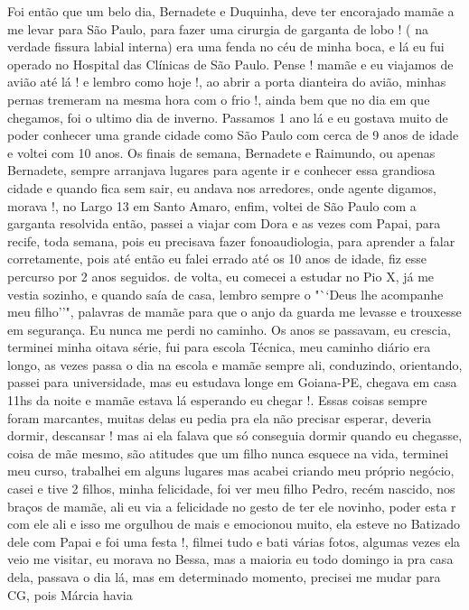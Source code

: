 \documentclass[
  brazil,
  a6paper,
  oneside,
  landscape,
  14pt]{scrbook}
\begin{document}
Foi então que um belo dia, Bernadete e Duquinha, deve ter encorajado
mamãe a me levar para São Paulo, para fazer uma cirurgia de garganta de
lobo ! ( na verdade fissura labial interna) era uma fenda no céu de
minha boca, e lá eu fui operado no Hospital das Clínicas de São Paulo.
Pense ! mamãe e eu viajamos de avião até lá ! e lembro como hoje !, ao
abrir a porta dianteira do avião, minhas pernas tremeram na mesma hora
com o frio !, ainda bem que no dia em que chegamos, foi o ultimo dia de
inverno. Passamos 1 ano lá e eu gostava muito de poder conhecer uma
grande cidade como São Paulo com cerca de 9 anos de idade e voltei com
10 anos. Os finais de semana, Bernadete e Raimundo, ou apenas Bernadete,
sempre arranjava lugares para agente ir e conhecer essa grandiosa cidade
e quando fica sem sair, eu andava nos arredores, onde agente digamos,
morava !, no Largo 13 em Santo Amaro, enfim, voltei de São Paulo com a
garganta resolvida então, passei a viajar com Dora e as vezes com Papai,
para recife, toda semana, pois eu precisava fazer fonoaudiologia, para
aprender a falar corretamente, pois até então eu falei errado até os 10
anos de idade, fiz esse percurso por 2 anos seguidos. de volta, eu
comecei a estudar no Pio X, já me vestia sozinho, e quando saía de casa,
lembro sempre o "``Deus lhe acompanhe meu filho''", palavras de mamãe
para que o anjo da guarda me levasse e trouxesse em segurança. Eu nunca
me perdi no caminho. Os anos se passavam, eu crescia, terminei minha
oitava série, fui para escola Técnica, meu caminho diário era longo, as
vezes passa o dia na escola e mamãe sempre ali, conduzindo, orientando,
passei para universidade, mas eu estudava longe em Goiana-PE, chegava em
casa 11hs da noite e mamãe estava lá esperando eu chegar !. Essas coisas
sempre foram marcantes, muitas delas eu pedia pra ela não precisar
esperar, deveria dormir, descansar ! mas ai ela falava que só conseguia
dormir quando eu chegasse, coisa de mãe mesmo, são atitudes que um filho
nunca esquece na vida, terminei meu curso, trabalhei em alguns lugares
mas acabei criando meu próprio negócio, casei e tive 2 filhos, minha
felicidade, foi ver meu filho Pedro, recém nascido, nos braços de mamãe,
ali eu via a felicidade no gesto de ter ele novinho, poder esta r com
ele ali e isso me orgulhou de mais e emocionou muito, ela esteve no
Batizado dele com Papai e foi uma festa !, filmei tudo e bati várias
fotos, algumas vezes ela veio me visitar, eu morava no Bessa, mas a
maioria eu todo domingo ia pra casa dela, passava o dia lá, mas em
determinado momento, precisei me mudar para CG, pois Márcia havia
\end{document}
